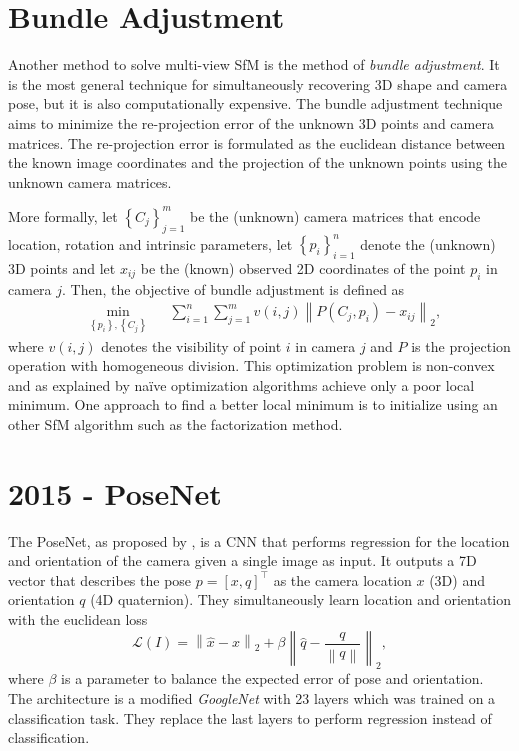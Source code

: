 	\section{Bundle Adjustment} 
		Another method to solve multi-view SfM is the method of \emph{bundle adjustment}.
		It is the most general technique for simultaneously recovering 3D shape and camera pose, but it is also computationally expensive.
		The bundle adjustment technique aims to minimize the re-projection error of the unknown 3D points and camera matrices.
		The re-projection error is formulated as the euclidean distance between the known image coordinates and the projection of the unknown points using the unknown camera matrices.
		
		More formally, let 
			$\left \lbrace C_j \right \rbrace_{j = 1}^{m}$ 
		be the (unknown) camera matrices that encode location, rotation and intrinsic parameters, let 
			$\left \lbrace p_i \right \rbrace_{i = 1}^{n}$ 
		denote the (unknown) 3D points and let $x_{ij}$ be the (known) observed 2D coordinates of the point $p_i$ in camera $j$.
		Then, the objective of bundle adjustment is defined as
		\begin{equation}\label{eq:bundle_adjustment}
			\begin{aligned}
				& \underset{\left\lbrace p_i \right\rbrace, \left\lbrace C_j \right\rbrace}{\text{min}}
				& & \sum_{i = 1}^{n} \sum_{j = 1}^{m} v(i, j) \left\| P(C_j, p_i) - x_{ij} \right\|_2 ,
			\end{aligned}
		\end{equation}
		where $v(i, j)$ denotes the visibility of point $i$ in camera $j$ and $P$ is the projection operation with homogeneous division.
		This optimization problem is non-convex and as explained by \cite{survey2017} na\"ive optimization algorithms achieve only a poor local minimum.
		One approach to find a better local minimum is to initialize using an other SfM algorithm such as the factorization method.
		
	
	\section{2015 - PoseNet}
		The PoseNet, as proposed by \cite{kendall2015posenet}, is a CNN that performs regression for the location and orientation of the camera given a single image as input.
		It outputs a 7D vector that describes the pose $p = [x, q]^\top$ as the camera location $x$ (3D) and orientation $q$ (4D quaternion).
		They simultaneously learn location and orientation with the euclidean loss
		\begin{equation}
			\mathcal{L}(I) = 
			\left\|
				\hat{x} - x 
			\right\|_2 
			+ \beta 
			\left\| 
				\hat{q} - \frac{q}{\left\| q \right\|} 
			\right\|_2,
		\end{equation}
		where $\beta$ is a parameter to balance the expected error of pose and orientation.
		The architecture is a modified \emph{GoogleNet} with 23 layers which was trained on a classification task.
		They replace the last layers to perform regression instead of classification.
		
